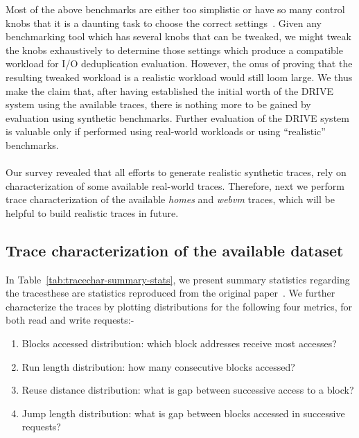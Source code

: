 Most of the above benchmarks are either too simplistic or have so many
control knobs that it is a daunting task to choose the correct
settings~\cite{generating-datasets}.
Given any benchmarking tool which has several knobs that can be tweaked,
we might tweak the knobs exhaustively to determine those
settings which produce a compatible workload for I/O deduplication evaluation.
However, the onus of proving that the resulting tweaked workload is a
realistic workload would still loom large. We thus make the claim that,
after having established the initial worth of the DRIVE system using
the available traces, there is nothing more to be gained by evaluation
using synthetic benchmarks. Further evaluation of the DRIVE system is
valuable only if performed using real-world workloads or using ``realistic''
benchmarks.
\\
\\
Our survey revealed that all efforts to generate realistic synthetic traces,
rely on characterization of some available real-world traces.
Therefore, next we perform trace characterization of the 
available \textit{homes} 
and \textit{webvm} traces,
which will be helpful to build realistic traces in future.

\subsection{Trace characterization of the available dataset}
In Table~\ref{tab:tracechar-summary-stats}, we present 
summary statistics regarding the traces\textemdash{}these are statistics reproduced
from the original paper~\cite{iodedup}.
We further characterize the traces by plotting distributions for 
the following four metrics, for both read and write requests:-
\begin{enumerate}
		\singlespacing
    \item Blocks accessed distribution: which block addresses receive most accesses?
    \item Run length distribution: how many consecutive blocks accessed?
    \item Reuse distance distribution: what is gap between successive access to a block?
    \item Jump length distribution: what is gap between blocks accessed in successive requests?
\end{enumerate}

